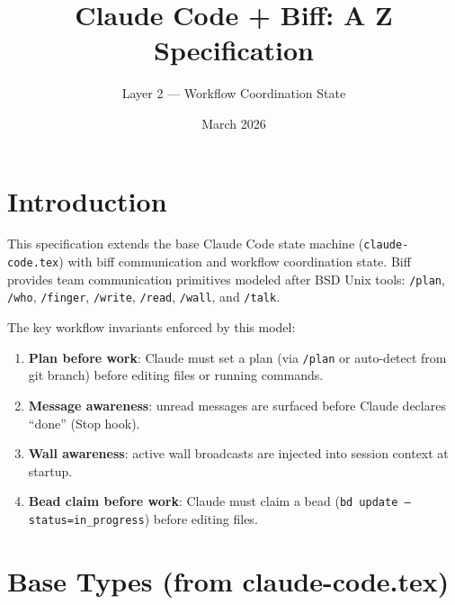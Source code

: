 \documentclass[a4paper,10pt,fleqn]{article}
\begin{document}
\title{Claude Code + Biff: A Z Specification}
\author{Layer 2 --- Workflow Coordination State}
\date{March 2026}
\maketitle

\tableofcontents
\newpage

\section{Introduction}

This specification extends the base Claude Code state machine
(\texttt{claude-code.tex}) with biff communication and workflow
coordination state. Biff provides team communication primitives
modeled after BSD Unix tools: \texttt{/plan}, \texttt{/who},
\texttt{/finger}, \texttt{/write}, \texttt{/read}, \texttt{/wall},
and \texttt{/talk}.

The key workflow invariants enforced by this model:

\begin{enumerate}
  \item \textbf{Plan before work}: Claude must set a plan (via
    \texttt{/plan} or auto-detect from git branch) before editing
    files or running commands.
  \item \textbf{Message awareness}: unread messages are surfaced
    before Claude declares ``done'' (Stop hook).
  \item \textbf{Wall awareness}: active wall broadcasts are injected
    into session context at startup.
  \item \textbf{Bead claim before work}: Claude must claim a bead
    (\texttt{bd update --status=in\_progress}) before editing files.
\end{enumerate}

\section{Base Types (from claude-code.tex)}

\begin{zed}
\end{zed}
\end{document}
